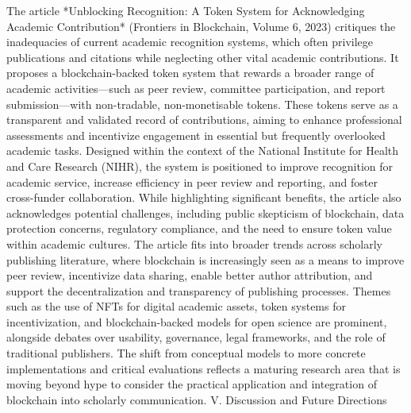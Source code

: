 \documentclass{article}
\begin{document}
The article *Unblocking Recognition: A Token System for Acknowledging Academic Contribution* (Frontiers in Blockchain, Volume 6, 2023) critiques the inadequacies of current academic recognition systems, which often privilege publications and citations while neglecting other vital academic contributions. It proposes a blockchain-backed token system that rewards a broader range of academic activities—such as peer review, committee participation, and report submission—with non-tradable, non-monetisable tokens. These tokens serve as a transparent and validated record of contributions, aiming to enhance professional assessments and incentivize engagement in essential but frequently overlooked academic tasks. Designed within the context of the National Institute for Health and Care Research (NIHR), the system is positioned to improve recognition for academic service, increase efficiency in peer review and reporting, and foster cross-funder collaboration. While highlighting significant benefits, the article also acknowledges potential challenges, including public skepticism of blockchain, data protection concerns, regulatory compliance, and the need to ensure token value within academic cultures. The article fits into broader trends across scholarly publishing literature, where blockchain is increasingly seen as a means to improve peer review, incentivize data sharing, enable better author attribution, and support the decentralization and transparency of publishing processes. Themes such as the use of NFTs for digital academic assets, token systems for incentivization, and blockchain-backed models for open science are prominent, alongside debates over usability, governance, legal frameworks, and the role of traditional publishers. The shift from conceptual models to more concrete implementations and critical evaluations reflects a maturing research area that is moving beyond hype to consider the practical application and integration of blockchain into scholarly communication.
V. Discussion and Future Directions
\end{document}
